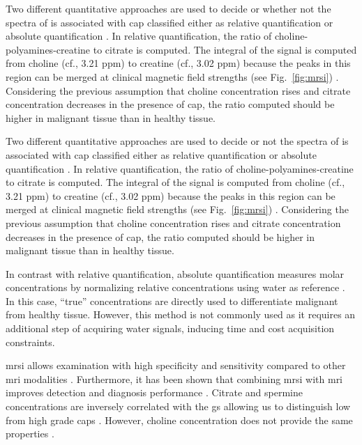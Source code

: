 Two different quantitative approaches are used to decide or whether not the spectra of  is associated with \ac{cap} classified either as relative quantification or absolute quantification \cite{Lemaitre2011}.
In relative quantification, the ratio of choline-polyamines-creatine to citrate is computed.
The integral of the signal is computed from choline (cf., 3.21 ppm) to creatine (cf., 3.02 ppm) because the peaks in this region can be merged at clinical magnetic field strengths (see Fig.~\ref{fig:mrsi}) \cite{Hoeks2011,Graaf2000}.
Considering the previous assumption that choline concentration rises and citrate concentration decreases in the presence of \ac{cap}, the ratio computed should be higher in malignant tissue than in healthy tissue. 

Two different quantitative approaches are used to decide or not the spectra of  is associated with \ac{cap} classified either as relative quantification or absolute quantification \cite{Lemaitre2011}.
In relative quantification, the ratio of choline-polyamines-creatine to citrate is computed.
The integral of the signal is computed from choline (cf., 3.21 ppm) to creatine (cf., 3.02 ppm) because the peaks in this region can be merged at clinical magnetic field strengths (see Fig.~\ref{fig:mrsi}) \cite{Hoeks2011,Graaf2000}.
Considering the previous assumption that choline concentration rises and citrate concentration decreases in the presence of \ac{cap}, the ratio computed should be higher in malignant tissue than in healthy tissue. 

In contrast with relative quantification, absolute quantification measures molar concentrations by normalizing relative concentrations using water as reference \cite{Lemaitre2011}.
In this case, ``true'' concentrations are directly used to differentiate malignant from healthy tissue.
However, this method is not commonly used as it requires an additional step of acquiring water signals, inducing time and cost acquisition constraints.

\ac{mrsi} allows examination with high specificity and sensitivity compared to other \ac{mri} modalities \cite{Choi2007}.
Furthermore, it has been shown that combining \ac{mrsi} with \ac{mri} improves detection and diagnosis performance \cite{Scheidler1999a,Kaji1998,Vilanova2009}.
Citrate and spermine concentrations are inversely correlated with the \ac{gs} allowing us to distinguish low from high grade \acp{cap} \cite{Giskeodegard2013}.
However, choline concentration does not provide the same properties \cite{Giskeodegard2013}.

